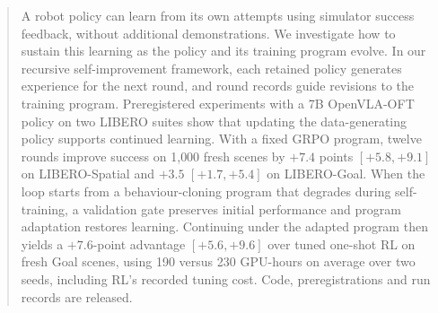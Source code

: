 \begin{abstract}
A robot policy can learn from its own attempts using simulator success feedback, without additional demonstrations. We investigate how to sustain this learning as the policy and its training program evolve. In our recursive self-improvement framework, each retained policy generates experience for the next round, and round records guide revisions to the training program. Preregistered experiments with a 7B OpenVLA-OFT policy on two LIBERO suites show that updating the data-generating policy supports continued learning. With a fixed GRPO program, twelve rounds improve success on 1{,}000 fresh scenes by $+7.4$ points $[+5.8, +9.1]$ on LIBERO-Spatial and $+3.5$ $[+1.7, +5.4]$ on LIBERO-Goal. When the loop starts from a behaviour-cloning program that degrades during self-training, a validation gate preserves initial performance and program adaptation restores learning. Continuing under the adapted program then yields a $+7.6$-point advantage $[+5.6, +9.6]$ over tuned one-shot RL on fresh Goal scenes, using 190 versus 230 GPU-hours on average over two seeds, including RL's recorded tuning cost. Code, preregistrations and run records are released.
\end{abstract}

